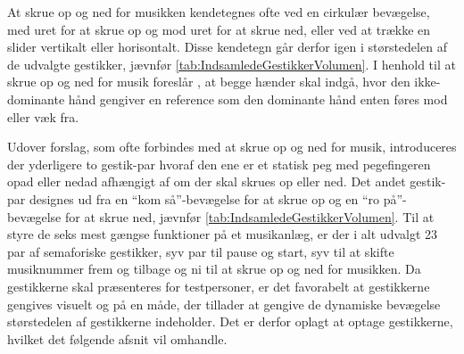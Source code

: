 \noindent
%
At skrue op og ned for musikken kendetegnes ofte ved en cirkulær bevægelse, med uret for at skrue op og mod uret for at skrue ned, eller ved at trække en slider vertikalt eller horisontalt. Disse kendetegn går derfor igen i størstedelen af de udvalgte gestikker, jævnfør \autoref{tab:IndsamledeGestikkerVolumen}. I henhold til at skrue op og ned for musik foreslår \textcite[s. 48]{PDF:UserDefinedGesturesTV}, at begge hænder skal indgå, hvor den ikke-dominante hånd gengiver en reference som den dominante hånd enten føres mod eller væk fra.

Udover forslag, som ofte forbindes med at skrue op og ned for musik, introduceres der yderligere to gestik-par hvoraf den ene er et statisk peg med pegefingeren opad eller nedad afhængigt af om der skal skrues op eller ned. Det andet gestik-par designes ud fra en \enquote{kom så}-bevægelse for at skrue op og en \enquote{ro på}-bevægelse for at skrue ned, jævnfør \autoref{tab:IndsamledeGestikkerVolumen}. \blankline
%
Til at styre de seks mest gængse funktioner på et musikanlæg, er der i alt udvalgt 23 par af semaforiske gestikker, syv par til pause og start, syv til at skifte musiknummer frem og tilbage og ni til at skrue op og ned for musikken. Da gestikkerne skal præsenteres for testpersoner, er det favorabelt at gestikkerne gengives visuelt og på en måde, der tillader at gengive de dynamiske bevægelse størstedelen af gestikkerne indeholder. Det er derfor oplagt at optage gestikkerne, hvilket det følgende afsnit vil omhandle. 
%

